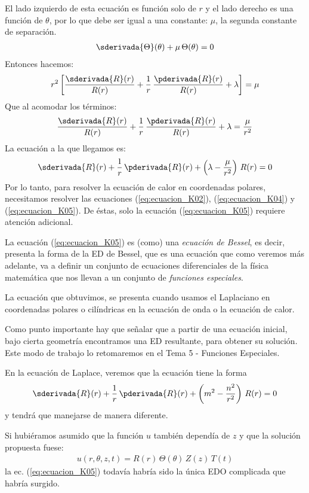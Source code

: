 El lado izquierdo de esta ecuación es función solo de $r$ y el lado derecho es una función de $\theta$, por lo que debe ser igual a una constante: $\mu$, la segunda constante de separación.
\begin{align}
\sderivada{\Theta} (\theta) + \mu \, \Theta (\theta) = 0
\label{eq:ecuacion_K04}    
\end{align}
Entonces hacemos:
\begin{align*}
r^{2} \left[ \dfrac{\sderivada{R} (r)}{R (r)} + \dfrac{1}{r} \, \dfrac{\pderivada{R} (r)}{R (r)} + \lambda \right] = \mu
\end{align*}
Que al acomodar los términos:
\begin{align*}
\dfrac{\sderivada{R} (r)}{R (r)} + \dfrac{1}{r} \, \dfrac{\pderivada{R} (r)}{R (r)} + \lambda = \dfrac{\mu}{r^{2}}
\end{align*}
La ecuación a la que llegamos es:
\begin{align}
\sderivada{R} (r) + \dfrac{1}{r} \, \pderivada{R} (r) + \left( \lambda - \dfrac{\mu}{r^{2}} \right) \, R(r) = 0
\label{eq:ecuacion_K05}    
\end{align}
Por lo tanto, para resolver la ecuación de calor en coordenadas polares, necesitamos resolver las ecuaciones (\ref{eq:ecuacion_K02}), (\ref{eq:ecuacion_K04}) y (\ref{eq:ecuacion_K05}). De éstas, solo la ecuación (\ref{eq:ecuacion_K05}) requiere atención adicional.
\par
La ecuación (\ref{eq:ecuacion_K05}) es (como) una \emph{ecuación de Bessel}, es decir, presenta la forma de la ED de Bessel, que es una ecuación que como veremos más adelante, va a definir un conjunto de ecuaciones diferenciales de la física matemática que nos llevan a un conjunto de \emph{funciones especiales}.
\par
La ecuación que obtuvimos, se presenta cuando usamos el Laplaciano en coordenadas polares o cilíndricas en la ecuación de onda o la ecuación de calor.
\par
Como punto importante hay que señalar que a partir de una ecuación inicial, bajo cierta geometría encontramos una ED resultante, para obtener su solución. Este modo de trabajo lo retomaremos en el Tema 5 - Funciones Especiales.
\par
En la ecuación de Laplace, veremos que la ecuación tiene la forma
\begin{align*}
\sderivada{R} (r) + \dfrac{1}{r} \, \pderivada{R} (r) + \left( m^{2} - \dfrac{n^{2}}{r^{2}} \right) \, R(r) = 0
\end{align*}
y tendrá que manejarse de manera diferente.
\par
Si hubiéramos asumido que la función $u$ también dependía de $z$ y que la solución propuesta fuese:
\begin{align*}
u(r, \theta, z, t) =  R(r) \, \Theta (\theta) \, Z(z) \, T(t) 
\end{align*}
la ec. (\ref{eq:ecuacion_K05}) todavía habría sido la única EDO complicada que habría surgido.


